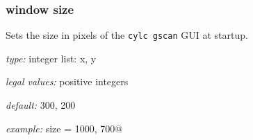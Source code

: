 \subsubsection{window size}

Sets the size in pixels of the \lstinline=cylc gscan= GUI at startup.

\begin{myitemize}
    \item {\em type:} integer list: x, y
    \item {\em legal values:} positive integers
    \item {\em default:} 300, 200
    \item {\em example:} \lstinline@window size = 1000, 700@
\end{myitemize}
